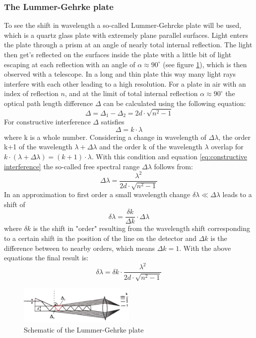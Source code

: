 \documentclass[12pt]{article}
\begin{document}
\subsubsection{The Lummer-Gehrke plate}
To see the shift in wavelength a so-called Lummer-Gehrcke plate  will be used, which is a quartz glass plate with extremely plane parallel surfaces. Light enters the plate through a prism at an angle of nearly total internal reflection. The light then get's reflected on the surfaces inside the plate with a little bit of light escaping at each reflection with an angle of $\alpha \approx 90^\circ$ (see figure \ref{fig:lummergehrke}), which is then observed with a telescope. In a long and thin plate this way many light rays interfere with each other leading to a high resolution. For a plate in air with an index of reflection $n$, and at the limit of total internal reflection $\alpha\approx 90 ^\circ$ the optical path length difference $\Delta$ can be calculated using the following equation:
\begin{equation}
\Delta=\Delta_1-\Delta_2=2d \cdot \sqrt{n^2-1}
\end{equation}
For constructive interference $\Delta$ satisfies
\begin{equation}
\Delta=k\cdot\lambda 
\label{eq:constructive interference}
\end{equation} 
where k is a whole number. Considering a change in wavelength of $\Delta\lambda$, the order k+1 of the wavelength $\lambda+\Delta\lambda$ and the order k of the wavelength $\lambda$ overlap for $k \cdot (\lambda+\Delta\lambda)=(k+1)\cdot\lambda$. With this condition and equation \ref{eq:constructive interference} the so-called free spectral range $\Delta\lambda$ follows from:
\begin{equation}
\Delta\lambda=\frac{\lambda^2}{2d \cdot \sqrt{n^2-1}}
\end{equation}
In an approximation to first order a small wavelength change $\delta\lambda \ll \Delta\lambda$ leads to a shift of 
\begin{equation}
\delta \lambda= \frac{\delta k}{\Delta k} \cdot \Delta\lambda
\end{equation}
where $\delta k$ is the shift in "order" resulting from the wavelength shift corresponding to a certain shift in the position of the line on the detector and $\Delta k$ is the difference between to nearby orders, which means $\Delta k=1$. With the above equations the final result is:
\begin{equation}
\delta\lambda=\delta k \cdot \frac{\lambda^2}{2d\cdot\sqrt{n^2-1}}
\label{dlambda}
\end{equation}
\begin{figure}
\centering
\includegraphics[width=0.5\textwidth]{fig/lummergehrke.png}
\caption{Schematic of the Lummer-Gehrke plate}
\label{fig:lummergehrke}
\end{figure}
\end{document}
